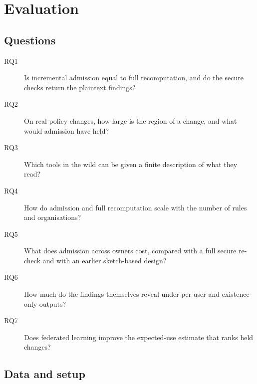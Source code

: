 \section{Evaluation}\label{sec:evaluation}

\subsection{Questions}
\begin{description}
\item[RQ1] Is incremental admission equal to full recomputation, and do the secure checks return the plaintext findings?
\item[RQ2] On real policy changes, how large is the region of a change, and what would admission have held?
\item[RQ3] Which tools in the wild can be given a finite description of what they read?
\item[RQ4] How do admission and full recomputation scale with the number of rules and organisations?
\item[RQ5] What does admission across owners cost, compared with a full secure re-check and with an earlier sketch-based design?
\item[RQ6] How much do the findings themselves reveal under per-user and existence-only outputs?
\item[RQ7] Does federated learning improve the expected-use estimate that ranks held changes?
\end{description}

\subsection{Data and setup}\label{sec:setup}
